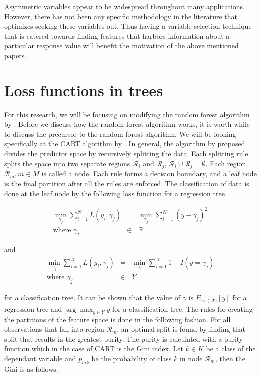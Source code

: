\documentclass[twoside,11pt]{article}
\begin{document}
Asymmetric variables appear to be widespread throughout many applications. However, there  has not been any specific methodology in the literature that optimizes seeking these variables out. Thus having a variable selection technique that is catered towards finding features that harbors information about a particular response value will benefit the motivation of the above mentioned papers. 

\section{Loss functions in trees}
For this research, we will be focusing on modifying the random forest algorithm by \citet{Breiman01}. Before we discuss how the random forest algorithm works, it is worth while to discuss the precursor to the random forest algorithm. We will be looking specifically at the CART algorithm by \citet{Breiman84}. In general, the algorithm by \citet{Breiman84} proposed divides the predictor space by recursively splitting the data. Each splitting rule splits the space into two separate regions $\mathcal{R}_i$ and $\mathcal{R}_j$, $\mathcal{R}_i \cup \mathcal{R}_j =\emptyset$. Each region $\mathcal{R}_m,m \in M$ is called a node. Each rule forms a decision boundary, and a leaf node is the final partition after all the rules are enforced. The classification of data is done at the leaf node by the following loss function for a regression tree

\begin{equation}
	\begin{array}{rcl}
		\min_{\gamma_j} \sum_{i=1}^N L(y_i,\gamma_j) & = &  \min_{\gamma_j} \sum_{i=1}^N (y-\gamma_j)^2 \\
	\mbox{where }	\gamma_j &\in & \mathbb{R}	
	\end{array}
\end{equation}

and 
\begin{equation}
	\begin{array}{rcl}
		 \min_{\gamma_j} \sum_{i=1}^N L(y_i,\gamma_j) & = &  \min_{\gamma_j} \sum_{i=1}^N 1-I(y=\gamma_j) \\
	\mbox{where }	\gamma_j &\in & Y
	\end{array}
\end{equation}

 
for a classification tree. It can be shown that the value of $\gamma$ is $E_{x_i \in \mathcal{R}_j}[y]$ for a regression tree and $\arg\max_{y\in Y} y$ for a classification tree. The rules for creating the partitions of the feature space is done in the following fashion. For all observations that fall into region $\mathcal{R}_m$, an optimal split is found by finding that split that results in the greatest purity. The purity is calculated with a purity function which in the case of CART is the Gini index. Let $k \in K$ be a class of the dependant variable and $p_{mk}$ be the probability of class $k$ in node $\mathcal{R}_m$, then the Gini is as follows.
\end{document}
